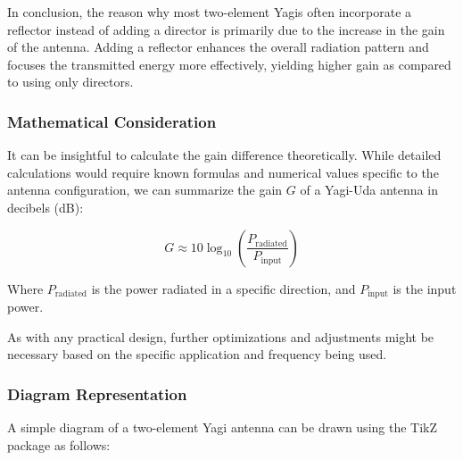 In conclusion, the reason why most two-element Yagis often incorporate a reflector instead of adding a director is primarily due to the increase in the gain of the antenna. Adding a reflector enhances the overall radiation pattern and focuses the transmitted energy more effectively, yielding higher gain as compared to using only directors.

\subsubsection{Mathematical Consideration}

It can be insightful to calculate the gain difference theoretically. While detailed calculations would require known formulas and numerical values specific to the antenna configuration, we can summarize the gain \( G \) of a Yagi-Uda antenna in decibels (dB):

\[
G \approx 10 \log_{10} \left( \frac{P_{\text{radiated}}}{P_{\text{input}}} \right)
\]

Where \( P_{\text{radiated}} \) is the power radiated in a specific direction, and \( P_{\text{input}} \) is the input power. 

As with any practical design, further optimizations and adjustments might be necessary based on the specific application and frequency being used.

\subsubsection{Diagram Representation}

A simple diagram of a two-element Yagi antenna can be drawn using the TikZ package as follows:

\begin{center}
\end{center}
